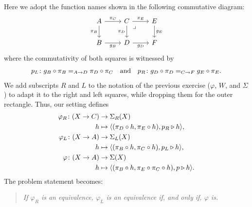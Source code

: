 \begin{solution}
    Here we adopt the function names shown in the following commutative diagram:
    \[
        \begin{tikzcd}
        A
                \arrow[r,"\pi_C"]
                \arrow[d,"\pi_B"']
            &C
                \arrow[r,"\pi_E"]
                \arrow[d,"\pi_D"']
                \arrow[rd,
                    "\lrcorner",
                    phantom,
                    very near start]
            &E
                \arrow[d,"g_E"]\\
        B
                \arrow[r,"g_B"']
            &D
                \arrow[r,"g_D"']
            &F
        \end{tikzcd}
    \]
    where the commutativity of both squares is witnessed by
    \[
        p_L\colon g_B\circ\pi_B\eq{A\to D}\pi_D\circ\pi_C
        \quad\text{and}\quad
        p_R\colon g_D\circ\pi_D\eq{C\to F}g_E\circ\pi_E.
    \]
    We add subscripts $R$ and $L$ to the notation of the previous exercise ($\varphi$, $W$, and $\Sigma$) to adapt it to the right and left squares, while dropping them for the outer rectangle. Thus, our setting defines
    \begin{align*}
        \varphi_R\colon(X\to C)&\to\Sigma_R(X)\\
        h&\mapsto
            \dep{
                (\pi_D\circ h,\pi_E\circ h),
                p_R\rwct h
            },\\
        \varphi_L\colon (X\to A)&\to\Sigma_L(X)\\
        h&\mapsto
            \dep{
                (\pi_B\circ h,\pi_C\circ h),
                p_L\rwct h
            },\\
        \varphi\colon(X\to A)&\to\Sigma(X)\\
        h&\mapsto
            \dep{
                (\pi_B\circ h,\pi_E\circ\pi_C\circ h),
                p\rwct h
            }.
    \end{align*}
    The problem statement becomes:
    \begin{quote}\itshape
        If $\varphi_R$ is an equivalence, $\varphi_L$ is an equivalence if, and only if, $\varphi$ is.
    \end{quote}


\end{solution}
